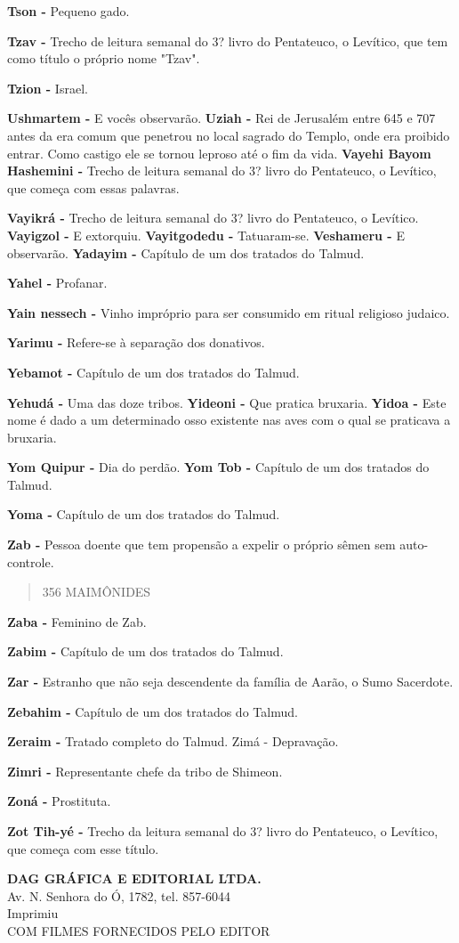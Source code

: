 \textbf{Tson -} Pequeno gado.

\textbf{Tzav -} Trecho de leitura semanal do 3? livro do Pentateuco, o
Levítico, que tem como título o próprio nome "Tzav".

\textbf{Tzion -} Israel.

\textbf{Ushmartem -} E vocês observarão. \textbf{Uziah -} Rei de
Jerusalém entre 645 e 707 antes da era comum que penetrou no local
sagrado do Templo, onde era proibido entrar. Como castigo ele se tornou
leproso até o fim da vida. \textbf{Vayehi Bayom Hashemini -} Trecho de
leitura semanal do 3? livro do Pen­tateuco, o Levítico, que começa com
essas palavras.

\textbf{Vayikrá -} Trecho de leitura semanal do 3? livro do Pentateuco,
o Levítico. \textbf{Vayigzol -} E extorquiu. \textbf{Vayitgodedu -}
Tatuaram-se. \textbf{Veshameru -} E observarão. \textbf{Yadayim -}
Capítulo de um dos trata­dos do Talmud.

\textbf{Yahel -} Profanar.

\textbf{Yain nessech -} Vinho impróprio pa­ra ser consumido em ritual
religioso ju­daico.

\textbf{Yarimu -} Refere-se à separação dos donativos.

\textbf{Yebamot -} Capítulo de um dos trata­dos do Talmud.

\textbf{Yehudá -} Uma das doze tribos. \textbf{Yideoni -} Que pratica
bruxaria. \textbf{Yidoa -} Este nome é dado a um deter­minado osso
existente nas aves com o qual se praticava a bruxaria.

\textbf{Yom Quipur -} Dia do perdão. \textbf{Yom Tob -} Capítulo de um
dos trata­dos do Talmud.

\textbf{Yoma -} Capítulo de um dos tratados do Talmud.

\textbf{Zab -} Pessoa doente que tem propen­são a expelir o próprio
sêmen sem au­to-controle.

\begin{quote}
356 MAIMÔNIDES
\end{quote}

\textbf{Zaba -} Feminino de Zab.

\textbf{Zabim -} Capítulo de um dos tratados do Talmud.

\textbf{Zar -} Estranho que não seja descen­dente da família de Aarão, o
Sumo Sa­cerdote.

\textbf{Zebahim -} Capítulo de um dos trata­dos do Talmud.

\textbf{Zeraim -} Tratado completo do Talmud. Zimá - Depravação.

\textbf{Zimri -} Representante chefe da tribo de Shimeon.

\textbf{Zoná -} Prostituta.

\textbf{Zot Tih-yé -} Trecho da leitura sema­nal do 3? livro do
Pentateuco, o Leví­tico, que começa com esse título.

\textbf{DAG GRÁFICA E EDITORIAL LTDA.\\
}Av. N. Senhora do Ó, 1782, tel. 857-6044\\
Imprimiu\\
COM FILMES FORNECIDOS PELO EDITOR
